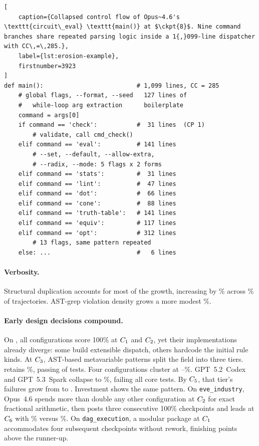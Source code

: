 \begin{lstlisting}[
    caption={Collapsed control flow of Opus~4.6's \texttt{circuit\_eval} \texttt{main()} at $\ckpt{8}$. Nine command branches share repeated parsing logic inside a 1{,}099-line dispatcher with CC\,=\,285.},
    label={lst:erosion-example},
    firstnumber=3923
]
def main():                          # 1,099 lines, CC = 285
    # global flags, --format, --seed   127 lines of
    #   while-loop arg extraction      boilerplate
    command = args[0]
    if command == 'check':           #  31 lines  (CP 1)
        # validate, call cmd_check()
    elif command == 'eval':          # 141 lines
        # --set, --default, --allow-extra,
        # --radix, --mode: 5 flags x 2 forms
    elif command == 'stats':         #  31 lines
    elif command == 'lint':          #  47 lines
    elif command == 'dot':           #  66 lines
    elif command == 'cone':          #  88 lines
    elif command == 'truth-table':   # 141 lines
    elif command == 'equiv':         # 117 lines
    elif command == 'opt':           # 312 lines
        # 13 flags, same pattern repeated
    else: ...                        #   6 lines
\end{lstlisting}

\paragraph{Verbosity.} Structural duplication accounts for most of the growth, increasing by \vfCloneGrowthPct{}\% across \vfCloneIncPct{}\% of trajectories. AST-grep violation density grows a more modest \vfAstOverallGrowth{}\%.

\paragraph{Early design decisions compound.}
On \codesearch{}, all \abNumConfigs{} configurations score 100\% at $C_{1}$ and $C_{2}$, yet their implementations already diverge: some build extensible dispatch, others hardcode the initial rule kinds. At $C_{3}$, AST-based metavariable patterns split the field into three tiers. \abCsTierOneModel{} retains \abCsTierOneRate\%, passing \abCsTierOnePassedTests{} of \abCsNumCpThreeTests{} tests. Four configurations cluster at \abCsTierTwoMin--\abCsTierTwoMax\%. GPT~5.2~Codex and GPT~5.3~Spark collapse to \abCsTierThreeRate\%, failing all \abCsTierThreeCoreFailed{} core tests. By $C_{5}$, that tier's failures grow from \abCsTierThreeCpThreeFailures{} to \abCsTierThreeCpFiveFailures{}. Investment shows the same pattern. On \texttt{eve\_industry}, Opus~4.6 spends more than double any other configuration at $C_{2}$ for exact fractional arithmetic, then posts three consecutive 100\% checkpoints and leads at $C_{6}$ with \abEveBestCpSixRate\% versus \abEveSecondCpSixRate\%. On \texttt{dag\_execution}, a modular package at $C_{1}$ accommodates four subsequent checkpoints without rework, finishing \abDagCpOneGap{} points above the runner-up.


